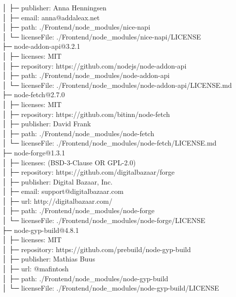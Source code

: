\documentclass[
    paper=a4,
    twoside=false,
    parskip=half,
    listof=entryprefix,
    listof=totoc,
    index=totoc,
    bibliography=totoc,
    headsepline,
]{scrbook}
\begin{document}
    │  ├─ publisher: Anna Henningsen\\
    │  ├─ email: anna@addaleax.net\\
    │  ├─ path: ./Frontend/node\_modules/nice-napi\\
    │  └─ licenseFile: ./Frontend/node\_modules/nice-napi/LICENSE\\
    ├─ node-addon-api@3.2.1\\
    │  ├─ licenses: MIT\\
    │  ├─ repository: https://github.com/nodejs/node-addon-api\\
    │  ├─ path: ./Frontend/node\_modules/node-addon-api\\
    │  └─ licenseFile: ./Frontend/node\_modules/node-addon-api/LICENSE.md\\
    ├─ node-fetch@2.7.0\\
    │  ├─ licenses: MIT\\
    │  ├─ repository: https://github.com/bitinn/node-fetch\\
    │  ├─ publisher: David Frank\\
    │  ├─ path: ./Frontend/node\_modules/node-fetch\\
    │  └─ licenseFile: ./Frontend/node\_modules/node-fetch/LICENSE.md\\
    ├─ node-forge@1.3.1\\
    │  ├─ licenses: (BSD-3-Clause OR GPL-2.0)\\
    │  ├─ repository: https://github.com/digitalbazaar/forge\\
    │  ├─ publisher: Digital Bazaar, Inc.\\
    │  ├─ email: support@digitalbazaar.com\\
    │  ├─ url: http://digitalbazaar.com/\\
    │  ├─ path: ./Frontend/node\_modules/node-forge\\
    │  └─ licenseFile: ./Frontend/node\_modules/node-forge/LICENSE\\
    ├─ node-gyp-build@4.8.1\\
    │  ├─ licenses: MIT\\
    │  ├─ repository: https://github.com/prebuild/node-gyp-build\\
    │  ├─ publisher: Mathias Buus\\
    │  ├─ url: @mafintosh\\
    │  ├─ path: ./Frontend/node\_modules/node-gyp-build\\
    │  └─ licenseFile: ./Frontend/node\_modules/node-gyp-build/LICENSE\\
\end{document}
